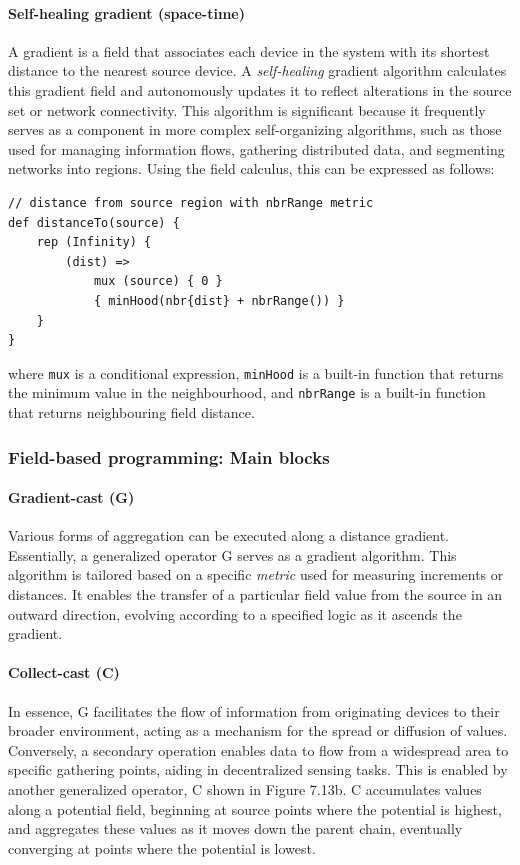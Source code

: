 \paragraph*{Self-healing gradient (space-time)}
A gradient is a field that associates each device in the system with its shortest distance to the nearest source device. 
 A \emph{self-healing} gradient algorithm calculates this gradient field and autonomously 
 updates it to reflect alterations in the source set or network connectivity. 
 This algorithm is significant because it frequently serves as a component in more complex self-organizing algorithms, 
 such as those used for managing information flows, gathering distributed data, and segmenting networks into regions.
 Using the field calculus, this can be expressed as follows:
\begin{lstlisting}[language=scafi]
// distance from source region with nbrRange metric
def distanceTo(source) {
    rep (Infinity) { 
        (dist) =>
            mux (source) { 0 } 
            { minHood(nbr{dist} + nbrRange()) }
    }
}
\end{lstlisting}
where \lstinline|mux| is a conditional expression, 
 \lstinline|minHood| is a built-in function that returns the minimum value in the neighbourhood, 
 and \lstinline|nbrRange| is a built-in function that returns neighbouring field distance.

\subsubsection{Field-based programming: Main blocks}
\paragraph*{Gradient-cast (G)}
Various forms of aggregation 
 can be executed along a distance gradient.
 Essentially, a generalized operator G serves as a gradient algorithm. 
 This algorithm is tailored based on a specific \emph{metric} used for measuring increments or distances. 
 It enables the transfer of a particular field value from the source in an outward direction, 
 evolving according to a specified logic as it ascends the gradient.
\paragraph*{Collect-cast (C)}
In essence, G facilitates the flow of information from originating devices to their broader environment, 
 acting as a mechanism for the spread or diffusion of values. 
 Conversely, a secondary operation enables data to flow from a widespread area to specific gathering points, 
 aiding in decentralized sensing tasks. 
 This is enabled by another generalized operator, C shown in Figure 7.13b. C accumulates values along a potential field, beginning at source points where the potential is highest, and aggregates these values as it moves down the parent chain, eventually converging at points where the potential is lowest.
